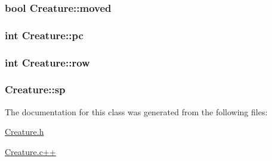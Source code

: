 \hypertarget{classCreature_a4b02dbc0cbbad42704ac20f3fbe52eee}{
\subsubsection[{moved}]{\setlength{\rightskip}{0pt plus 5cm}bool Creature\-::moved\hspace{0.3cm}{\ttfamily [private]}}}\label{classCreature_a4b02dbc0cbbad42704ac20f3fbe52eee}
\hypertarget{classCreature_a81b808ceee6ddc5c0a97e0b97b19a707}{
\subsubsection[{pc}]{\setlength{\rightskip}{0pt plus 5cm}int Creature\-::pc\hspace{0.3cm}{\ttfamily [private]}}}\label{classCreature_a81b808ceee6ddc5c0a97e0b97b19a707}
\hypertarget{classCreature_af069d60a967697bdc03404639fb0e494}{
\subsubsection[{row}]{\setlength{\rightskip}{0pt plus 5cm}int Creature\-::row\hspace{0.3cm}{\ttfamily [private]}}}\label{classCreature_af069d60a967697bdc03404639fb0e494}
\hypertarget{classCreature_ac630fe7db462274fc5546effe9fdba92}{
\subsubsection[{sp}]{ Creature\-::sp\hspace{0.3cm}{\ttfamily [private]}}}\label{classCreature_ac630fe7db462274fc5546effe9fdba92}


The documentation for this class was generated from the following files\-:\begin{DoxyCompactItemize}
\item 
\hyperlink{Creature_8h}{Creature.\-h}\item 
\hyperlink{Creature_8c_09_09}{Creature.\-c++}\end{DoxyCompactItemize}
